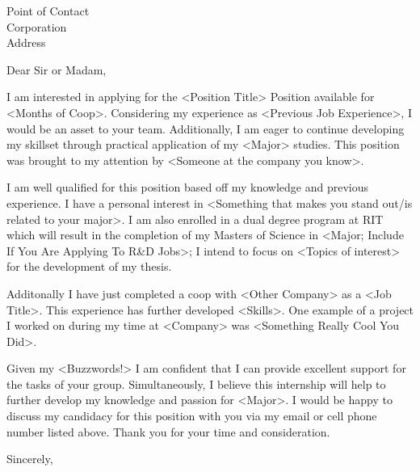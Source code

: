 \documentclass[11pt, a4paper]{letter} %
\begin{document}
\newcommand\poc{Point of Contact }              %
\newcommand\company{Corporation }             %
\newcommand\mailaddress{Address }
\begin{letter}{
    \poc \\
	\company \\
    \mailaddress
}


\opening{Dear Sir or Madam,}

I am interested in applying for the <Position Title> Position available for <Months of Coop>. Considering my experience as <Previous Job Experience>, I would be an asset to your team. Additionally, I am eager to continue developing my skillset through practical application of my <Major> studies. This position was brought to my attention by <Someone at the company you know>. 

I am well qualified for this position based off my knowledge and previous experience. I have a personal interest in <Something that makes you stand out/is related to your major>. I am also enrolled in a dual degree program at RIT which will result in the completion of my Masters of Science in <Major; Include If You Are Applying To R\&D Jobs>; I intend to focus on <Topics of interest> for the development of my thesis. 

Additonally I have just completed a coop with <Other Company> as a <Job Title>. This experience has further developed <Skills>. One example of a project I worked on during my time at <Company> was <Something Really Cool You Did>. 

Given my <Buzzwords!> I am confident that I can provide excellent support for the tasks of your group. Simultaneously, I believe this internship will help to further develop my knowledge and passion for <Major>. I would be happy to discuss my candidacy for this position with you via my email or cell phone number listed above. Thank you for your time and consideration.

\closing{Sincerely,}




\end{letter}
\end{document}
